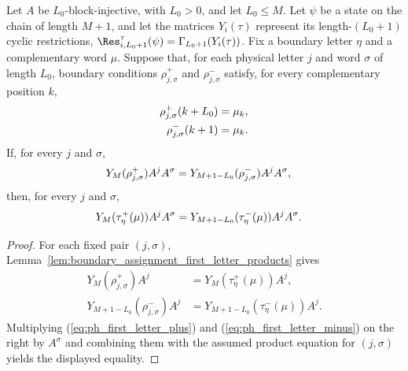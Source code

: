 \begin{lemma}
    \label{thm:boundary_closing_product_pointwise_compatible_boundary_assignments}
    \leanok
    Let $A$ be $L_0$-block-injective, with $L_0>0$, and let $L_0\le M$.
    Let $\psi$ be a state on the chain of length $M+1$, and let the matrices
    $Y_i(\tau)$ represent its length-$(L_0+1)$ cyclic restrictions,
    $\Res^\tau_{i,L_0+1}(\psi)=\Gamma_{L_0+1}(Y_i(\tau))$. Fix a boundary
    letter $\eta$ and a complementary word $\mu$. Suppose that, for each
    physical letter $j$ and word $\sigma$ of length $L_0$, boundary conditions
    $\rho^+_{j,\sigma}$ and $\rho^-_{j,\sigma}$ satisfy, for every complementary
    position $k$,
    \begin{align}
        \rho^+_{j,\sigma}(k+L_0) & =\mu_k, \notag \\
        \rho^-_{j,\sigma}(k+1)   & =\mu_k. \notag
    \end{align}
    If, for every $j$ and $\sigma$,
    \begin{align}
        Y_M(\rho^+_{j,\sigma})A^jA^\sigma
         & =Y_{M+1-L_0}(\rho^-_{j,\sigma})A^jA^\sigma, \notag
    \end{align}
    then, for every $j$ and $\sigma$,
    \begin{align}
        Y_M(\tau^+_\eta(\mu))A^jA^\sigma
         & =Y_{M+1-L_0}(\tau^-_\eta(\mu))A^jA^\sigma. \notag
    \end{align}
\end{lemma}

\begin{proof}
    \leanok
    For each fixed pair $(j,\sigma)$,
    Lemma~\ref{lem:boundary_assignment_first_letter_products} gives
    \begin{align}
        Y_M(\rho^+_{j,\sigma})A^j
         & =Y_M(\tau^+_\eta(\mu))A^j,
        \label{eq:ph_first_letter_plus}       \\
        Y_{M+1-L_0}(\rho^-_{j,\sigma})A^j
         & =Y_{M+1-L_0}(\tau^-_\eta(\mu))A^j.
        \label{eq:ph_first_letter_minus}
    \end{align}
    Multiplying (\ref{eq:ph_first_letter_plus}) and
    (\ref{eq:ph_first_letter_minus}) on the right by $A^\sigma$ and combining
    them with the assumed product equation for $(j,\sigma)$ yields the
    displayed equality.
\end{proof}


